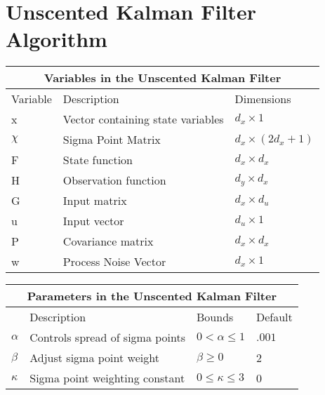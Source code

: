 \section{Unscented Kalman Filter Algorithm}
\begin{center}
    
\centering
\begin{tabular}{ |p{2cm}||p{5cm}|p{2cm}| }
    \hline
    \multicolumn{3}{|c|}{Variables in the Unscented Kalman Filter } \\ 
    \hline
    Variable & Description & Dimensions \\
    \hline
    x & Vector containing state variables & $d_x \times 1 $\\ 
    $\chi $& Sigma Point Matrix &$ d_x \times (2 d_x + 1) $\\
    F & State function & $d_x \times d_x $  \\ 
    H & Observation function & $d_y \times d_x$\\
    G & Input matrix & $d_x \times d_u$\\
    u & Input vector  & $d_u \times 1$\\
    P & Covariance matrix & $d_x \times d_x $  \\
    w & Process Noise Vector & $d_x \times 1$\\
    \hline
\end{tabular} 
\end{center}
\begin{center}
\begin{tabular}{ |p{1cm}||p{5cm}|p{2cm}| p{1cm}| }
    \hline
    \multicolumn{4}{|c|}{Parameters in the Unscented Kalman Filter } \\ 
    \hline
     & Description & Bounds & Default \\
    \hline
    $\alpha$ & Controls spread of sigma points & $0 < \alpha \leq 1$ & $.001$\\
    $\beta$ & Adjust sigma point weight & $\beta \geq 0$ & 2\\
    $\kappa $ & Sigma point weighting constant & $0 \leq \kappa \leq 3$  & 0\\
    \hline
\end{tabular}
\end{center}

